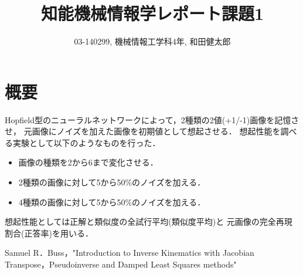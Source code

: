 \documentclass[10pt,twocolumn]{jarticle}
\title{知能機械情報学レポート課題1}
\author{03-140299, 機械情報工学科4年, 和田健太郎}
\begin{document}
\maketitle

\section{概要}
Hopfield型のニューラルネットワークによって，2種類の2値(+1/-1)画像を記憶させ，
元画像にノイズを加えた画像を初期値として想起させる．
想起性能を調べる実験として以下のようなものを行った．
\begin{itemize}
  \item 画像の種類を2から6まで変化させる．
  \item 2種類の画像に対して5から50\%のノイズを加える．
  \item 4種類の画像に対して5から50\%のノイズを加える．
\end{itemize}

想起性能としては正解と類似度の全試行平均(類似度平均)と
元画像の完全再現割合(正答率)を用いる．


\begin{thebibliography}{9}
   Samuel R．Buss，"Introduction to Inverse Kinematics with Jacobian Transpose，Pseudoinverse and Damped Least Squares methods"
\end{thebibliography}
\end{document}

